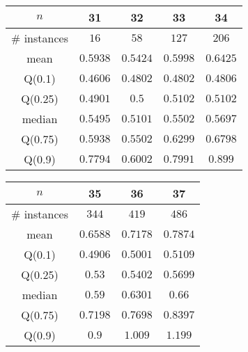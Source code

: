 \begin{tabular}{c|cccc} 
\hline 
$n$ & 31 & 32 & 33 & 34 \tabularnewline 
\hline 
\hline 
\# instances & $16$ & $58$ & $127$ & $206$ \tabularnewline 
mean & $0.5938$ & $0.5424$ & $0.5998$ & $0.6425$ \tabularnewline 
Q(0.1) & $0.4606$ & $0.4802$ & $0.4802$ & $0.4806$ \tabularnewline 
Q(0.25) & $0.4901$ & $0.5$ & $0.5102$ & $0.5102$ \tabularnewline 
median & $0.5495$ & $0.5101$ & $0.5502$ & $0.5697$ \tabularnewline 
Q(0.75) & $0.5938$ & $0.5502$ & $0.6299$ & $0.6798$ \tabularnewline 
Q(0.9) & $0.7794$ & $0.6002$ & $0.7991$ & $0.899$ \tabularnewline 
\hline 
\end{tabular} 
\medskip{} 

\begin{tabular}{c|ccc} 
\hline 
$n$ & 35 & 36 & 37 \tabularnewline 
\hline 
\hline 
\# instances & $344$ & $419$ & $486$ \tabularnewline 
mean & $0.6588$ & $0.7178$ & $0.7874$ \tabularnewline 
Q(0.1) & $0.4906$ & $0.5001$ & $0.5109$ \tabularnewline 
Q(0.25) & $0.53$ & $0.5402$ & $0.5699$ \tabularnewline 
median & $0.59$ & $0.6301$ & $0.66$ \tabularnewline 
Q(0.75) & $0.7198$ & $0.7698$ & $0.8397$ \tabularnewline 
Q(0.9) & $0.9$ & $1.009$ & $1.199$ \tabularnewline 
\hline 
\end{tabular} 
\medskip{} 

